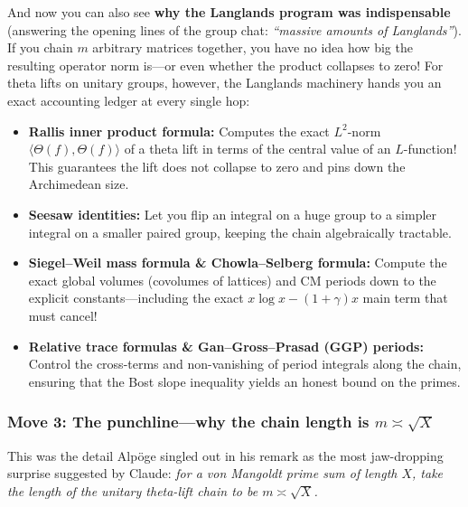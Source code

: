 And now you can also see \textbf{why the Langlands program was indispensable} (answering the opening lines of the group chat: \emph{``massive amounts of Langlands''}). If you chain \(m\) arbitrary matrices together, you have no idea how big the resulting operator norm is---or even whether the product collapses to zero! For theta lifts on unitary groups, however, the Langlands machinery hands you an exact accounting ledger at every single hop:
\begin{itemize}\setlength{\itemsep}{3pt}\setlength{\parsep}{0pt}
  \item \textbf{Rallis inner product formula:} Computes the exact \(L^2\)-norm \(\langle \Theta(f), \Theta(f) \rangle\) of a theta lift in terms of the central value of an \(L\)-function! This guarantees the lift does not collapse to zero and pins down the Archimedean size.
  \item \textbf{Seesaw identities:} Let you flip an integral on a huge group to a simpler integral on a smaller paired group, keeping the chain algebraically tractable.
  \item \textbf{Siegel--Weil mass formula \& Chowla--Selberg formula:} Compute the exact global volumes (covolumes of lattices) and CM periods down to the explicit constants---including the exact \(x\log x - (1+\gamma)x\) main term that must cancel!
  \item \textbf{Relative trace formulas \& Gan--Gross--Prasad (GGP) periods:} Control the cross-terms and non-vanishing of period integrals along the chain, ensuring that the Bost slope inequality yields an honest bound on the primes.
\end{itemize}

\subsubsection*{Move 3: The punchline---why the chain length is \(m \asymp \sqrt{X}\)}

This was the detail Alp\"oge singled out in his remark as the most jaw-dropping surprise suggested by Claude: \emph{for a von Mangoldt prime sum of length \(X\), take the length of the unitary theta-lift chain to be \(m \asymp \sqrt{X}\).}

